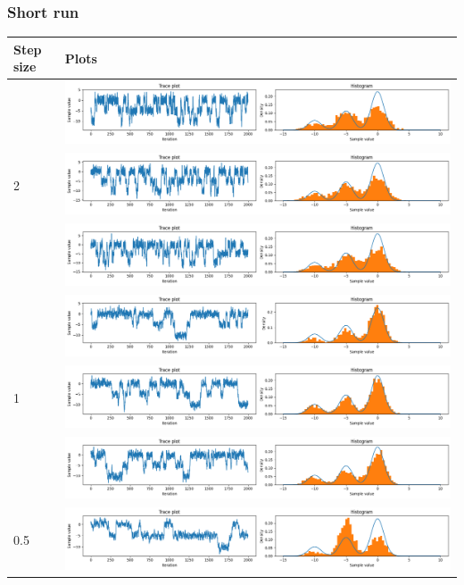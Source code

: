 \documentclass{article}
\theoremstyle{definition}
\newcommand{\1}{\mathbbm{1}}
\begin{document}
\subsubsection{Short run}
{\renewcommand{\arraystretch}{4}%
	\begin{tabular}{|l|l|}
		\hline
	Step size & Plots\\

	\hline
	\multirow{3}{*}{2} & \multicolumn{1}{l}{\includegraphics[width=0.8\linewidth, height=0.1\linewidth, valign=m]{Different variance/21.png}} \\
	& \multicolumn{1}{l}{\includegraphics[width=0.8\linewidth, height=0.1\linewidth, valign=m]{Different variance/22.png}} \\
	& \multicolumn{1}{l}{\includegraphics[width=0.8\linewidth, height=0.1\linewidth, valign=m]{Different variance/23.png}} \\
	\hline
	\multirow{3}{*}{1} & \multicolumn{1}{l}{\includegraphics[width=0.8\linewidth, height=0.1\linewidth, valign=m]{Different variance/11.png}} \\
	& \multicolumn{1}{l}{\includegraphics[width=0.8\linewidth, height=0.1\linewidth, valign=m]{Different variance/12.png}} \\
	& \multicolumn{1}{l}{\includegraphics[width=0.8\linewidth, height=0.1\linewidth, valign=m]{Different variance/13.png}} \\
	\hline
	\multirow{3}{*}{0.5} & \multicolumn{1}{l}{\includegraphics[width=0.8\linewidth, height=0.1\linewidth, valign=m]{Different variance/0_51.png}} \\

\end{tabular}}
\end{document}
